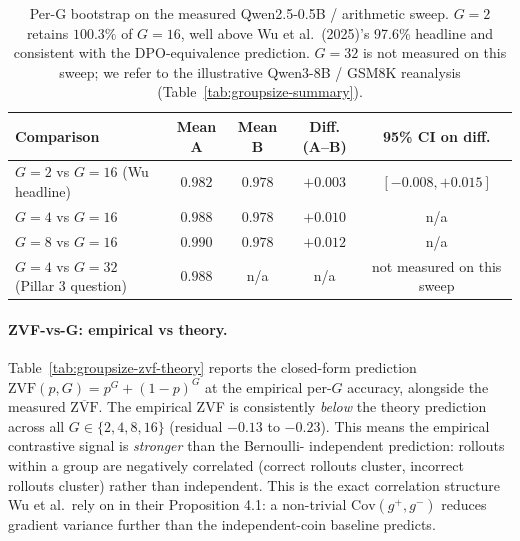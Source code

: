 \documentclass{article}
\begin{document}
\begin{table}[htbp]
\centering
\small
\begin{tabular}{lcccc}
\toprule
Comparison & Mean A & Mean B & Diff. (A--B) & 95\% CI on diff. \\
\midrule
$G{=}2$ vs $G{=}16$ (Wu headline)        & $0.982$ & $0.978$ & $+0.003$ & $[-0.008, +0.015]$ \\
$G{=}4$ vs $G{=}16$                      & $0.988$ & $0.978$ & $+0.010$ & n/a                \\
$G{=}8$ vs $G{=}16$                      & $0.990$ & $0.978$ & $+0.012$ & n/a                \\
$G{=}4$ vs $G{=}32$ (Pillar 3 question)  & $0.988$ & n/a     & n/a     & not measured on this sweep \\
\bottomrule
\end{tabular}
\caption{Per-G bootstrap on the measured Qwen2.5-0.5B / arithmetic sweep.
$G{=}2$ retains $100.3\%$ of $G{=}16$, well above Wu et al.\ (2025)'s
97.6\% headline and consistent with the DPO-equivalence prediction.
$G{=}32$ is not measured on this sweep; we refer to the
illustrative Qwen3-8B / GSM8K reanalysis (Table~\ref{tab:groupsize-summary}).}
\label{tab:groupsize-dpo-check}
\end{table}

\paragraph{ZVF-vs-G: empirical vs theory.}
Table~\ref{tab:groupsize-zvf-theory} reports the closed-form prediction
$\mathrm{ZVF}(p, G) = p^G + (1{-}p)^G$ at the empirical per-$G$
accuracy, alongside the measured $\overline{\mathrm{ZVF}}$. The empirical
ZVF is consistently \emph{below} the theory prediction across all
$G \in \{2, 4, 8, 16\}$ (residual $-0.13$ to $-0.23$). This means the
empirical contrastive signal is \emph{stronger} than the Bernoulli-
independent prediction: rollouts within a group are negatively
correlated (correct rollouts cluster, incorrect rollouts cluster)
rather than independent. This is the exact correlation structure
Wu et al.\ rely on in their Proposition 4.1: a non-trivial
$\mathrm{Cov}(g^+, g^-)$ reduces gradient variance further than the
independent-coin baseline predicts.
\end{document}
